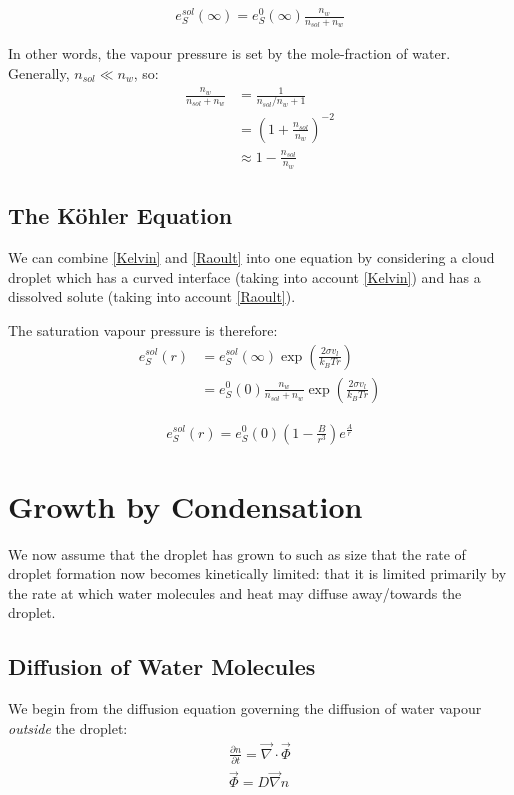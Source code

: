 \begin{align}
    e_S^{sol}(\infty)=e_S^0(\infty)\frac{n_w}{n_{sol}+n_w}
    \label{Raoult}
\end{align}

In other words, the vapour pressure is set by the mole-fraction of water. Generally, $n_{sol}\ll n_w$, so:
\begin{align*}
    \frac{n_w}{n_{sol}+n_w}&=\frac{1}{n_{sol}/n_w+1}\\
    &=\left( 1+\frac{n_{sol}}{n_w} \right)^{-2}\\
    &\approx 1 - \frac{n_{sol}}{n_w}
\end{align*}

\subsection{The Köhler Equation}

We can combine \ref{Kelvin} and \ref{Raoult} into one equation by considering a cloud droplet which has a curved interface (taking into account \ref{Kelvin}) and has a dissolved solute (taking into account \ref{Raoult}).

The saturation vapour pressure is therefore:
\begin{align*}
    e_S^{sol}(r)&=e_S^{sol}(\infty)\exp\left( \frac{2\sigma v_l}{k_B T r} \right)\\
    &=e_S^0(0)\frac{n_w}{n_{sol}+n_w}\exp\left( \frac{2\sigma v_l}{k_B T r} \right)
\end{align*}


\begin{align}
    e_S^{sol}(r)=e^0_{S}(0)\left( 1-\frac{B}{r^3} \right)e^{\frac{A}{r}}
\end{align}

\section{Growth by Condensation}

We now assume that the droplet has grown to such as size that the rate of droplet formation now becomes kinetically limited: that it is limited primarily by the rate at which water molecules and heat may diffuse away/towards the droplet.

\subsection{Diffusion of Water Molecules}

We begin from the diffusion equation governing the diffusion of water vapour \textit{outside} the droplet:
\begin{align}
    \frac{\partial n}{\partial t}=\vec{\nabla}\cdot\vec{\Phi}\\
    \label{Flux}
    \vec{\Phi}=D\vec{\nabla}n
\end{align}

